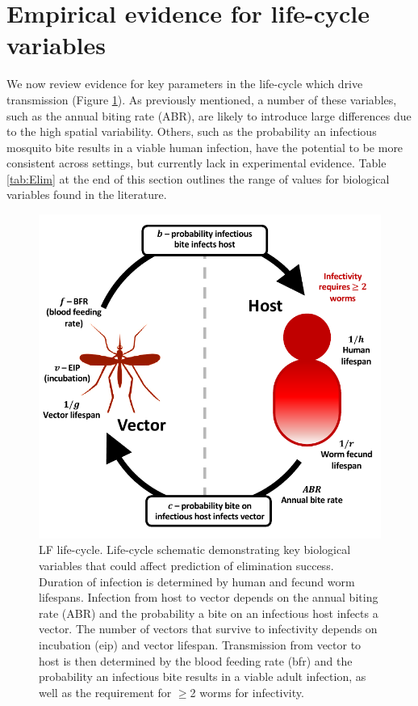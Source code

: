 \section[Life-cycle variables]{Empirical evidence for life-cycle variables}

We now review evidence for key parameters in the life-cycle which drive transmission (Figure \ref{fig:Elim_3}). As previously mentioned, a number of these variables, such as the annual biting rate (ABR), are likely to introduce large differences due to the high spatial variability. Others, such as the probability an infectious mosquito bite results in a viable human infection, have the potential to be more consistent across settings, but currently lack in experimental evidence. Table \ref{tab:Elim} at the end of this section outlines the range of values for biological variables found in the literature. 

\begin{figure}
    \centering
    \includegraphics{Project/Figures/LFElimination/Figure3.pdf}
    \caption[LF life-cycle.]{LF life-cycle. Life-cycle schematic demonstrating key biological variables that could affect prediction of elimination success. Duration of infection is determined by human and fecund worm lifespans. Infection from host to vector depends on the annual biting rate (ABR) and the probability a bite on an infectious host infects a vector. The number of vectors that survive to infectivity depends on incubation (\acrshort{eip}) and vector lifespan. Transmission from vector to host is then determined by the blood feeding rate (\acrshort{bfr}) and the probability an infectious bite results in a viable adult infection, as well as the requirement for $\geq$2 worms for infectivity.}
    \label{fig:Elim_3}
\end{figure}

